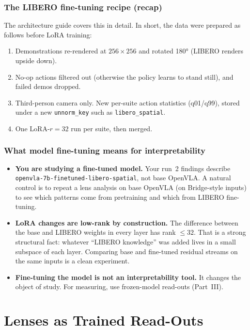 \documentclass[11pt]{article}
\begin{document}
\section{The LIBERO fine-tuning recipe (recap)}

The architecture guide covers this in detail. In short, the data were prepared as follows before LoRA training:
\begin{enumerate}
  \item Demonstrations re-rendered at $256\times256$ and rotated 180° (LIBERO renders upside down).
  \item No-op actions filtered out (otherwise the policy learns to stand still), and failed demos dropped.
  \item Third-person camera only. New per-suite action statistics (q01/q99), stored under a new \texttt{unnorm\_key} such as \texttt{libero\_spatial}.
  \item One LoRA-$r{=}32$ run per suite, then merged.
\end{enumerate}

\section{What model fine-tuning means for interpretability}

\begin{itemize}
  \item \textbf{You are studying a fine-tuned model.} Your run~2 findings describe \texttt{openvla-7b-finetuned-\allowbreak libero-spatial}, not base OpenVLA. A natural control is to repeat a lens analysis on base OpenVLA (on Bridge-style inputs) to see which patterns come from pretraining and which from LIBERO fine-tuning.
  \item \textbf{LoRA changes are low-rank by construction.} The difference between the base and LIBERO weights in every layer has rank $\le 32$. That is a strong structural fact: whatever ``LIBERO knowledge'' was added lives in a small subspace of each layer. Comparing base and fine-tuned residual streams on the same inputs is a clean experiment.
  \item \textbf{Fine-tuning the model is not an interpretability tool.} It changes the object of study. For measuring, use frozen-model read-outs (Part~III).
\end{itemize}

\part{Lenses as Trained Read-Outs}
\end{document}
